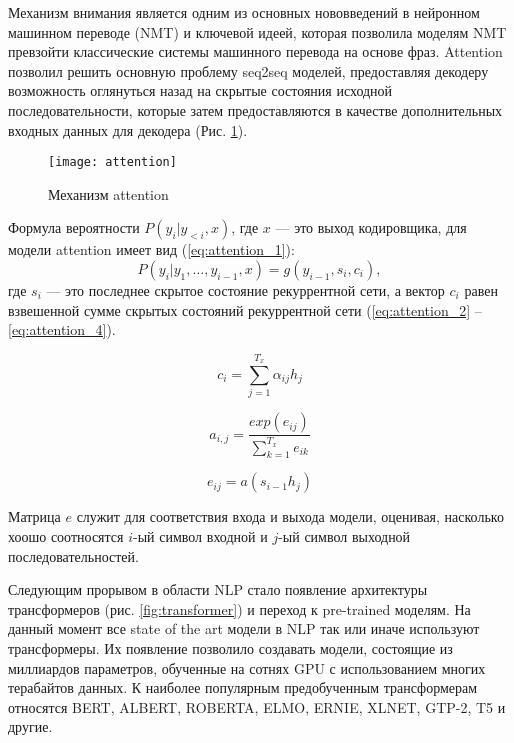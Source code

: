 Механизм внимания является одним из основных нововведений в нейронном машинном переводе (NMT) и ключевой идеей, которая позволила моделям NMT превзойти классические системы машинного перевода на основе фраз. Attention позволил решить основную проблему seq2seq моделей, предоставляя декодеру возможность оглянуться назад на скрытые состояния исходной последовательности, которые затем предоставляются в качестве дополнительных входных данных для декодера (Рис. \ref{fig:attention}).

\begin{figure}[ht]
	\centering
	\texttt{[image: attention]}  
	\caption{ Механизм attention }
	\label{fig:attention}
\end{figure}

Формула вероятности $P(y_i|y_{<i}, x)$, где $x$ --- это выход кодировщика, для модели attention имеет вид (\ref{eq:attention_1}):
\begin{equation}
	P(y_i|y_1,\dots,y_{i-1}, x) = g(y_{i-1}, s_i, c_i),
	\label{eq:attention_1}
\end{equation} где $s_i$ --- это последнее скрытое состояние рекуррентной сети, а вектор $c_i$ равен взвешенной сумме скрытых состояний рекуррентной сети (\ref{eq:attention_2} -- \ref{eq:attention_4}).

\begin{equation}
	c_i = \sum_{j=1}^{T_x}{\alpha_{ij}h_j}
	\label{eq:attention_2}
\end{equation}

\begin{equation}
	a_{i,j} = \frac{exp(e_{ij})}{\sum_{k=1}^{T_x}{e_{ik}}}
	\label{eq:attention_3}
\end{equation}

\begin{equation}
	e_{ij} = a(s_{i-1}h_j)
	\label{eq:attention_4}
\end{equation}

Матрица $e$ служит для соответствия входа и выхода модели, оценивая, насколько хоошо соотносятся $i$-ый символ входной и $j$-ый символ выходной последовательностей.~\cite{attention}

Следующим прорывом в области NLP стало появление архитектуры трансформеров (рис. \ref{fig:transformer}) и переход к pre-trained моделям. На данный момент все state of the art модели в NLP так или иначе используют трансформеры. Их появление позволило создавать модели, состоящие из миллиардов параметров, обученные на сотнях GPU с использованием многих терабайтов данных. К наиболее популярным предобученным трансформерам относятся BERT, ALBERT, ROBERTA, ELMO, ERNIE, XLNET, GTP-2, T5 и другие.

